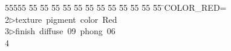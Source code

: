 %
%
\begin{tabbing}
55555 \= 55 \= 55 \= 55 \= 55 \= 55 \= 55 \= 55 \= 55 \= 55 \= 55 \= 55 \= 55 \= \>COLOR\_RED=\\[0pt]
2\>$\triangleright$\>texture\ pigment\ color\ Red\ \ \\[0pt]
3\>$\triangleright$\>finish\ diffuse\ 09\ phong\ 06\ \\[0pt]
4\>\end{tabbing}
